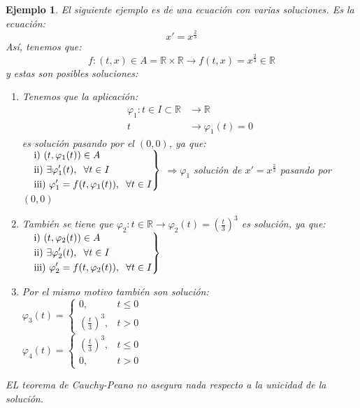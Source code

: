 \documentclass[11pt, a4paper,twoside]{article}
\theoremstyle{theorem-style}  %
\theoremstyle{definition-style}
\theoremstyle{example-style}
\newtheorem{example}{Ejemplo}[section]
\newenvironment{rcases}
{\left.\begin{aligned}}
	{\end{aligned}\right\rbrace}
\begin{document}
\begin{example}
	El siguiente ejemplo es de una ecuación con varias soluciones. Es la ecuación:
	\[x'=x^{\frac{2}{3}}\]
	Así, tenemos que:
	\[f:(t, x)\in A = \mathbb{R} \times \mathbb{R} \longrightarrow f(t, x) = x^{\frac{2}{3}} \in \mathbb{R}\]
	y estas son posibles soluciones: 
	\begin{enumerate}
		\item Tenemos que la aplicación:
		\begin{align*}
		\varphi_1: t \in I \subset \mathbb{R}& \longrightarrow \mathbb{R}\\
		t& \longrightarrow \varphi_1 (t) = 0
		\end{align*}
		es solución pasando por el $(0,0)$, ya que:\\
		$
		\begin{rcases}
			\quad&\text{i) } (t, \varphi_1 (t)) \in A \\
			&\text{ii) }\exists \varphi_1' (t),  \hspace{0,2cm} \forall t \in I \\
			&\text{iii) } \varphi_1' = f(t, \varphi_1 (t)), \hspace{0,2cm} \forall t \in I
		\end{rcases}$ $\Rightarrow \varphi_1$ solución de $x'=x^{\frac{2}{3}}$ pasando por $(0,0)$
		
		\item También se tiene que $\varphi_2: t \in \mathbb{R} \longrightarrow \varphi_2 (t) = (\frac{t}{3})^3$ es solución, ya que:\\
		$
		\begin{rcases}
			\quad&\text{i) } (t, \varphi_2 (t)) \in A \\
			&\text{ii) }\exists \varphi_2' (t),  \hspace{0,2cm} \forall t \in I \\
			&\text{iii) } \varphi_2' = f(t, \varphi_2 (t)), \hspace{0,2cm} \forall t \in I
		\end{rcases}$
		\item Por el mismo motivo también son solución:\\
		$\varphi_3 (t) = \begin{cases}
			0, &t\leq 0 \\
			(\frac{t}{3})^3, &t>0 
		\end{cases}$ \\
		$\varphi_4 (t) = \begin{cases}
		(\frac{t}{3})^3, &t\leq 0\\
		0, &t>0 
		\end{cases}$ 
	\end{enumerate}
EL teorema de Cauchy-Peano no asegura nada respecto a la unicidad de la solución.
\end{example}
\end{document}
